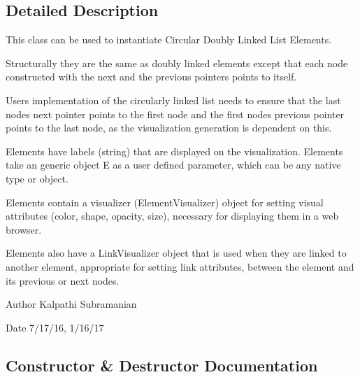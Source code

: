 \subsection{Detailed Description}
This class can be used to instantiate Circular Doubly Linked List Elements. 

Structurally they are the same as doubly linked elements except that each node constructed with the next and the previous pointers points to itself.

User\textquotesingle{}s implementation of the circularly linked list needs to ensure that the last node\textquotesingle{}s next pointer points to the first node and the first node\textquotesingle{}s previous pointer points to the last node, as the visualization generation is dependent on this.

Elements have labels (string) that are displayed on the visualization. Elements take an generic object E as a user defined parameter, which can be any native type or object.

Elements contain a visualizer (Element\+Visualizer) object for setting visual attributes (color, shape, opacity, size), necessary for displaying them in a web browser.

Elements also have a Link\+Visualizer object that is used when they are linked to another element, appropriate for setting link attributes, between the element and its previous or next nodes.

\begin{DoxyAuthor}{Author}
Kalpathi Subramanian
\end{DoxyAuthor}
\begin{DoxyDate}{Date}
7/17/16, 1/16/17 
\end{DoxyDate}


\subsection{Constructor \& Destructor Documentation}
\mbox{\label{class_bridges_1_1circ__dl__element_1_1_circ_d_lelement_a60b9eb3519f97da893e36a35b7e4f0ff}} 
